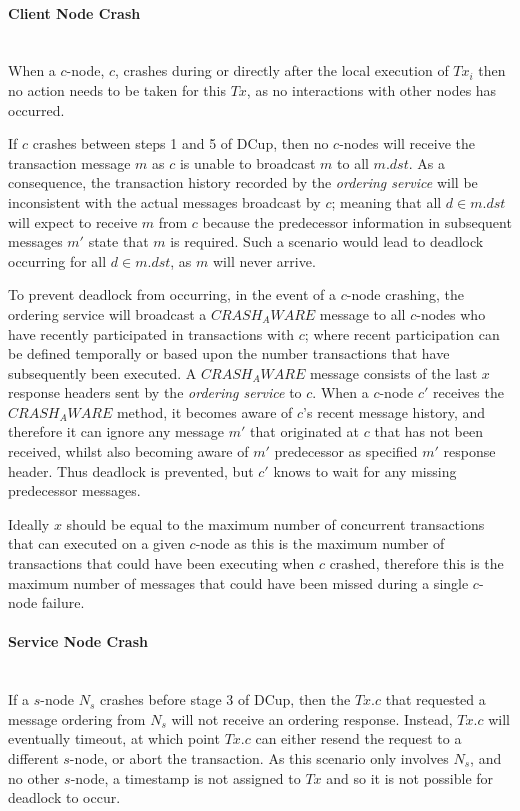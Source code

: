 	\paragraph{Client Node Crash} \hspace{0pt} \\
	When a $c$-node, $c$, crashes during or directly after the local execution of $Tx_i$ then no action needs to be taken for this $Tx$, as no interactions with other nodes has occurred.  
	
	If $c$ crashes between steps 1 and 5 of \textsf{DCup}, then no $c$-nodes will receive the transaction message $m$ as $c$ is unable to broadcast $m$ to all $m.dst$.  As a consequence, the transaction history recorded by the \emph{ordering service} will be inconsistent with the actual messages broadcast by $c$; meaning that all $d \in m.dst$ will expect to receive $m$ from $c$ because the predecessor information in subsequent messages $m'$ state that $m$ is required.  Such a scenario would lead to deadlock occurring for all $d \in m.dst$, as $m$ will never arrive.  
	
	To prevent deadlock from occurring, in the event of a $c$-node crashing, the ordering service will broadcast a $CRASH_AWARE$ message to all $c$-nodes who have recently participated in transactions with $c$; where recent participation can be defined temporally or based upon the number transactions that have subsequently been executed.  A $CRASH_AWARE$ message consists of the last $x$ response headers sent by the \emph{ordering service} to $c$.  When a $c$-node $c'$ receives the $CRASH_AWARE$ method, it becomes aware of $c$'s recent message history, and therefore it can ignore any message $m'$ that originated at $c$ that has not been received, whilst also becoming aware of $m'$ predecessor as specified $m'$ response header. Thus deadlock is prevented, but $c'$ knows to wait for any missing predecessor messages.  
	
	Ideally $x$ should be equal to the maximum number of concurrent transactions that can executed on a given $c$-node as this is the maximum number of transactions that could have been executing when $c$ crashed, therefore this is the maximum number of messages that could have been missed during a single $c$-node failure.  
	    
	\paragraph{Service Node Crash} \hspace{0pt} \\
	If a $s$-node $N_s$ crashes before stage 3 of \textsf{DCup}, then the $Tx.c$ that requested a message ordering from $N_s$ will not receive an ordering response.  Instead, $Tx.c$ will eventually timeout, at which point $Tx.c$ can either resend the request to a different $s$-node, or abort the transaction.  As this scenario only involves $N_s$, and no other $s$-node, a timestamp is not assigned to $Tx$ and so it is not possible for deadlock to occur.  
	
